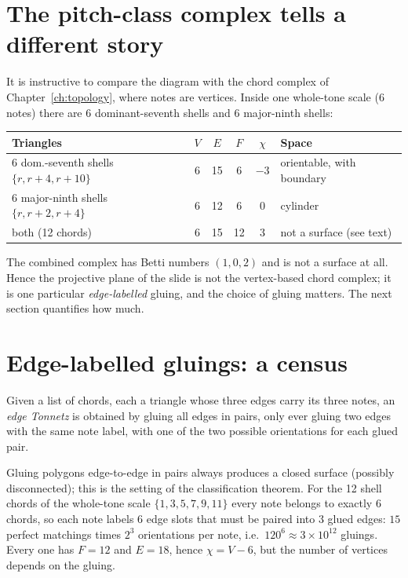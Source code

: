 \section{The pitch-class complex tells a different story}
It is instructive to compare the diagram with the chord complex of Chapter~\ref{ch:topology}, where notes are
vertices. Inside one whole-tone scale (6 notes) there are 6 dominant-seventh shells and 6 major-ninth shells:
\begin{center}\small
\begin{tabular}{@{}lccccl@{}}\toprule
Triangles & $V$ & $E$ & $F$ & $\chi$ & Space\\\midrule
6 dom.-seventh shells $\{r,r{+}4,r{+}10\}$ & 6 & 15 & 6 & $-3$ & orientable, with boundary\\
6 major-ninth shells $\{r,r{+}2,r{+}4\}$ & 6 & 12 & 6 & 0 & cylinder\\
both (12 chords) & 6 & 15 & 12 & 3 & not a surface (see text)\\\bottomrule
\end{tabular}
\end{center}
The combined complex has Betti numbers $(1,0,2)$ and is not a surface at all. Hence the projective plane of the
slide is not the vertex-based chord complex; it is one particular \emph{edge-labelled} gluing, and the choice of
gluing matters. The next section quantifies how much.

\section{Edge-labelled gluings: a census}
\begin{definition}
Given a list of chords, each a triangle whose three edges carry its three notes, an \emph{edge Tonnetz} is obtained
by gluing all edges in pairs, only ever gluing two edges with the same note label, with one of the two possible
orientations for each glued pair.
\end{definition}
Gluing polygons edge-to-edge in pairs always produces a closed surface (possibly disconnected); this is the setting
of the classification theorem. For the 12 shell chords of the whole-tone scale $\{1,3,5,7,9,11\}$ every note
belongs to exactly 6 chords, so each note labels 6 edge slots that must be paired into 3 glued edges: $15$ perfect
matchings times $2^3$ orientations per note, i.e.\ $120^6\approx3\times10^{12}$ gluings. Every one has $F=12$ and
$E=18$, hence $\chi=V-6$, but the number of vertices depends on the gluing.

